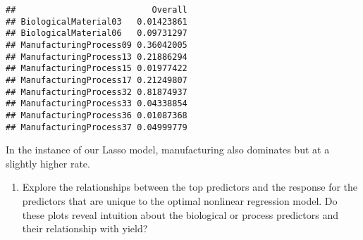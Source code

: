 \documentclass[
]{article}
\newenvironment{Shaded}{\begin{snugshade}}{\end{snugshade}}
\newcommand{\AttributeTok}[1]{\textcolor[rgb]{0.77,0.63,0.00}{#1}}
\newcommand{\CommentTok}[1]{\textcolor[rgb]{0.56,0.35,0.01}{\textit{#1}}}
\newcommand{\DecValTok}[1]{\textcolor[rgb]{0.00,0.00,0.81}{#1}}
\newcommand{\FloatTok}[1]{\textcolor[rgb]{0.00,0.00,0.81}{#1}}
\newcommand{\FunctionTok}[1]{\textcolor[rgb]{0.00,0.00,0.00}{#1}}
\newcommand{\NormalTok}[1]{#1}
\newcommand{\OtherTok}[1]{\textcolor[rgb]{0.56,0.35,0.01}{#1}}
\newcommand{\SpecialCharTok}[1]{\textcolor[rgb]{0.00,0.00,0.00}{#1}}
\providecommand{\tightlist}{%
  \setlength{\itemsep}{0pt}\setlength{\parskip}{0pt}}
\begin{document}
\begin{Shaded}
\end{Shaded}

\begin{verbatim}
##                           Overall
## BiologicalMaterial03   0.01423861
## BiologicalMaterial06   0.09731297
## ManufacturingProcess09 0.36042005
## ManufacturingProcess13 0.21886294
## ManufacturingProcess15 0.01977422
## ManufacturingProcess17 0.21249807
## ManufacturingProcess32 0.81874937
## ManufacturingProcess33 0.04338854
## ManufacturingProcess36 0.01087368
## ManufacturingProcess37 0.04999779
\end{verbatim}

In the instance of our Lasso model, manufacturing also dominates but at
a slightly higher rate.

\begin{enumerate}
\def\labelenumi{(\alph{enumi})}
\setcounter{enumi}{2}
\tightlist
\item
  Explore the relationships between the top predictors and the response
  for the predictors that are unique to the optimal nonlinear regression
  model. Do these plots reveal intuition about the biological or process
  predictors and their relationship with yield?
\end{enumerate}
\end{document}

